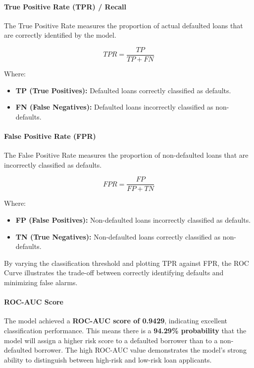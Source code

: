 \documentclass[11pt]{article}
\providecommand{\tightlist}{%
      \setlength{\itemsep}{0pt}\setlength{\parskip}{0pt}}
\begin{document}
\paragraph{True Positive Rate (TPR) /
Recall}\label{true-positive-rate-tpr-recall}

The True Positive Rate measures the proportion of actual defaulted loans
that are correctly identified by the model.

\[ TPR = \frac{TP}{TP + FN} \]

Where:

\begin{itemize}
\tightlist
\item
  \textbf{TP (True Positives):} Defaulted loans correctly classified as
  defaults.
\item
  \textbf{FN (False Negatives):} Defaulted loans incorrectly classified
  as non-defaults.
\end{itemize}

\paragraph{False Positive Rate (FPR)}\label{false-positive-rate-fpr}

The False Positive Rate measures the proportion of non-defaulted loans
that are incorrectly classified as defaults.

\[ FPR = \frac{FP}{FP + TN} \]

Where:

\begin{itemize}
\tightlist
\item
  \textbf{FP (False Positives):} Non-defaulted loans incorrectly
  classified as defaults.
\item
  \textbf{TN (True Negatives):} Non-defaulted loans correctly classified
  as non-defaults.
\end{itemize}

By varying the classification threshold and plotting TPR against FPR,
the ROC Curve illustrates the trade-off between correctly identifying
defaults and minimizing false alarms.

\paragraph{ROC-AUC Score}\label{roc-auc-score}

The model achieved a \textbf{ROC-AUC score of 0.9429}, indicating
excellent classification performance. This means there is a
\textbf{94.29\% probability} that the model will assign a higher risk
score to a defaulted borrower than to a non-defaulted borrower. The high
ROC-AUC value demonstrates the model's strong ability to distinguish
between high-risk and low-risk loan applicants.
\end{document}
